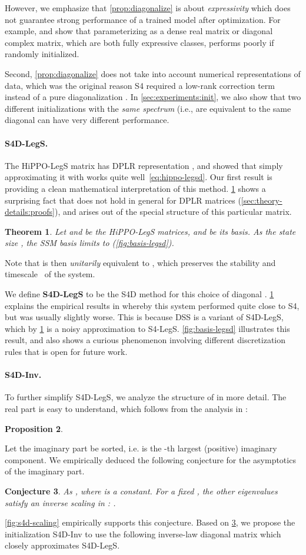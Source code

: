 \documentclass{article}
\newtheorem{theorem}{Theorem}
\newtheorem{conjecture}[theorem]{Conjecture}
\newtheorem{proposition}[theorem]{Proposition}
\newcommand{\para}[1]{\paragraph{#1}}
\begin{document}
However, we emphasize that \cref{prop:diagonalize} is about \emph{expressivity} which does not guarantee strong performance of a trained model after optimization.
For example, \citet{gu2022efficiently} and \citet{gupta2022diagonal} show that parameterizing  as a dense real matrix or diagonal complex matrix, which are both fully expressive classes, performs poorly if randomly initialized.

Second, \cref{prop:diagonalize} does not take into account numerical representations of data,
which was the original reason S4 required a low-rank correction term instead of a pure diagonalization \citep[Lemma 3.2]{gu2022efficiently}.
In \cref{sec:experiments:init}, we also show that two different initializations with the \emph{same spectrum} (i.e., are equivalent to the same diagonal  can have very different performance.

\para{S4D-LegS.}
The HiPPO-LegS matrix has DPLR representation ,
and \citet{gupta2022diagonal} showed that simply approximating it with  works quite well~\eqref{eq:hippo-legsd}.
Our first result is providing a clean mathematical interpretation of this method.
\cref{thm:legsd} shows a surprising fact that does not hold in general for DPLR matrices (\cref{sec:theory-details:proofs}), and arises out of the special structure of this particular matrix.
\begin{theorem}\label{thm:legsd}
  Let  and  be the HiPPO-LegS matrices, and  be its basis.
  As the state size , the SSM basis  limits to  (\cref{fig:basis-legsd}).
\end{theorem}
Note that  is then \emph{unitarily} equivalent to , which preserves the stability and timescale~\citep{gu2022hippo} of the system.

We define \textbf{S4D-LegS} to be the S4D method for this choice of diagonal .
\cref{thm:legsd} explains the empirical results in \citep{gupta2022diagonal} whereby this system performed quite close to S4, but was usually slightly worse. This is because DSS is a variant of S4D-LegS, which by \cref{thm:legsd} is a noisy approximation to S4-LegS. \cref{fig:basis-legsd} illustrates this result, and also shows a curious phenomenon involving different discretization rules that is open for future work.

\para{S4D-Inv.}
To further simplify S4D-LegS, we analyze the structure of  in more detail.
The real part is easy to understand, which follows from the analysis in \citep{gu2022efficiently}:
\begin{proposition}
\end{proposition}
Let the imaginary part be sorted, i.e.  is the -th largest (positive) imaginary component.
We empirically deduced the following conjecture for the asymptotics of the imaginary part.
\begin{conjecture}\label{conj:s4d-inv}
  As ,  where  is a constant.
  For a fixed , the other eigenvalues satisfy an inverse scaling in : .
\end{conjecture}
\cref{fig:s4d-scaling} empirically supports this conjecture. Based on \cref{conj:s4d-inv}, we propose the initialization S4D-Inv to use the following inverse-law diagonal matrix which closely approximates S4D-LegS.
\end{document}
